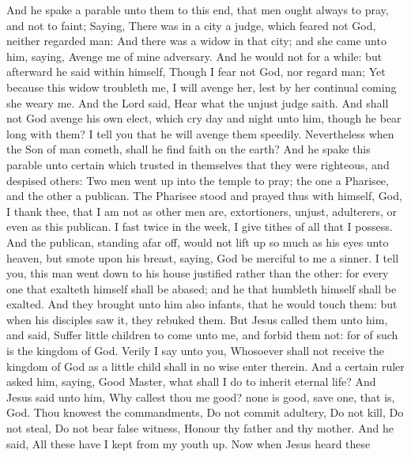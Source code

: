  And he spake a parable unto them to this end, that men
ought always to pray, and not to faint;  Saying, There was
in a city a judge, which feared not God, neither regarded man:
 And there was a widow in that city; and she came unto
him, saying, Avenge me of mine adversary.  And he would
not for a while: but afterward he said within himself, Though I fear not
God, nor regard man;  Yet because this widow troubleth me,
I will avenge her, lest by her continual coming she weary me.
 And the Lord said, Hear what the unjust judge saith.
 And shall not God avenge his own elect, which cry day and
night unto him, though he bear long with them?  I tell you
that he will avenge them speedily. Nevertheless when the Son of man
cometh, shall he find faith on the earth?  And he spake
this parable unto certain which trusted in themselves that they were
righteous, and despised others:  Two men went up into the
temple to pray; the one a Pharisee, and the other a publican.
 The Pharisee stood and prayed thus with himself, God, I
thank thee, that I am not as other men are, extortioners, unjust,
adulterers, or even as this publican.  I fast twice in
the week, I give tithes of all that I possess.  And the
publican, standing afar off, would not lift up so much as his eyes unto
heaven, but smote upon his breast, saying, God be merciful to me a
sinner.  I tell you, this man went down to his house
justified rather than the other: for every one that exalteth himself
shall be abased; and he that humbleth himself shall be exalted.
 And they brought unto him also infants, that he would
touch them: but when his disciples saw it, they rebuked them.
 But Jesus called them unto him, and said, Suffer little
children to come unto me, and forbid them not: for of such is the
kingdom of God.  Verily I say unto you, Whosoever shall
not receive the kingdom of God as a little child shall in no wise enter
therein.  And a certain ruler asked him, saying, Good
Master, what shall I do to inherit eternal life?  And
Jesus said unto him, Why callest thou me good? none is good, save one,
that is, God.  Thou knowest the commandments, Do not
commit adultery, Do not kill, Do not steal, Do not bear false witness,
Honour thy father and thy mother.  And he said, All these
have I kept from my youth up.  Now when Jesus heard these
